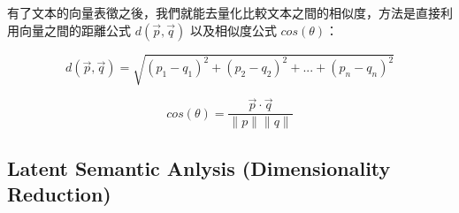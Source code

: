 \begin{Shaded}
\begin{Highlighting}[]
\OtherTok{\textless{}{-}} \NormalTok{(}\NormalTok{( }\NormalTok{,   }\NormalTok{,    }\NormalTok{,    }\NormalTok{,   }\NormalTok{,  }\NormalTok{,   }\NormalTok{,    }\NormalTok{,   }\NormalTok{ ,}
                 \NormalTok{,   }\NormalTok{,    }\NormalTok{,    }\NormalTok{,   }\NormalTok{,  }\NormalTok{,   }\NormalTok{,    }\NormalTok{,   }\NormalTok{ , }
                 \NormalTok{,   }\NormalTok{,    }\NormalTok{,    }\NormalTok{,   }\NormalTok{,  }\NormalTok{,   }\NormalTok{,    }\NormalTok{,   }\NormalTok{ ), }
               \NormalTok{, } \NormalTok{, } \NormalTok{)}

\CommentTok{\#\textgreater{}      [,1] [,2] [,3] [,4] [,5] [,6] [,7] [,8] [,9]}
\end{Highlighting}
\end{Shaded}

有了文本的向量表徵之後，我們就能去量化比較文本之間的相似度，方法是直接利用向量之間的距離公式
\(d(\overrightarrow{p}, \overrightarrow{q})\) 以及相似度公式
\(cos(\theta)\)：

\[
d(\overrightarrow{p}, \overrightarrow{q}) = \sqrt{ (p_1 - q_1)^2 + (p_2 - q_2)^2 + ... + (p_n - q_n)^2 }
\]

\[
cos(\theta) = \frac{\overrightarrow{p} \cdot \overrightarrow{q}}{\lVert p \rVert \lVert q \rVert }
\]

\hypertarget{latent-semantic-anlysis-dimensionality-reduction}{%
\subsection{Latent Semantic Anlysis (Dimensionality
Reduction)}\label{latent-semantic-anlysis-dimensionality-reduction}}

